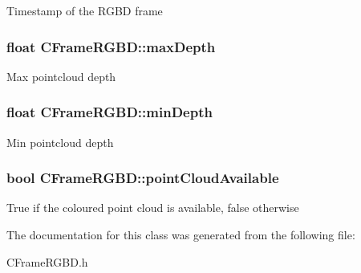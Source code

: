 \label{class_c_frame_r_g_b_d_a0f7c2fb4831a936c63b78305ab9298bd}
Timestamp of the RGBD frame \hypertarget{class_c_frame_r_g_b_d_abc84822b1baf13e257826ffb219dd913}{
\subsubsection[{maxDepth}]{\setlength{\rightskip}{0pt plus 5cm}float {\bf CFrameRGBD::maxDepth}}}
\label{class_c_frame_r_g_b_d_abc84822b1baf13e257826ffb219dd913}
Max pointcloud depth \hypertarget{class_c_frame_r_g_b_d_aaaab590488c350a37cba25c54ff2519c}{
\subsubsection[{minDepth}]{\setlength{\rightskip}{0pt plus 5cm}float {\bf CFrameRGBD::minDepth}}}
\label{class_c_frame_r_g_b_d_aaaab590488c350a37cba25c54ff2519c}
Min pointcloud depth \hypertarget{class_c_frame_r_g_b_d_ace30426f416cd66b2a0a256071d93464}{
\subsubsection[{pointCloudAvailable}]{\setlength{\rightskip}{0pt plus 5cm}bool {\bf CFrameRGBD::pointCloudAvailable}}}
\label{class_c_frame_r_g_b_d_ace30426f416cd66b2a0a256071d93464}
True if the coloured point cloud is available, false otherwise 

The documentation for this class was generated from the following file:\begin{DoxyCompactItemize}
\item 
CFrameRGBD.h\end{DoxyCompactItemize}
